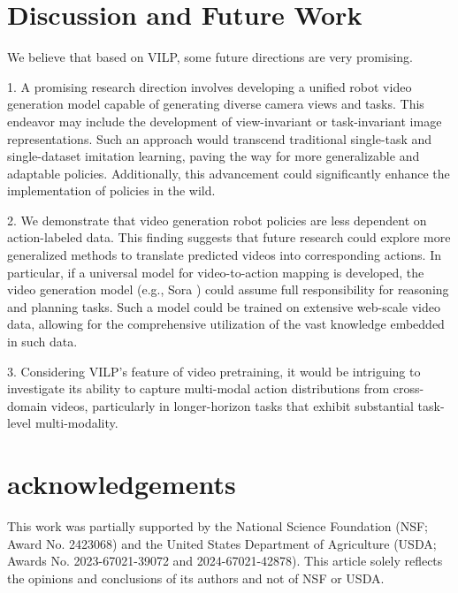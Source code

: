 \documentclass[doublecolumn]{IEEEtran}
\begin{document}
\section{Discussion and Future Work}\label{sec:discussion}
We believe that based on VILP, some future directions are very promising.

1. {A promising research direction involves developing a unified robot video generation model capable of generating diverse camera views and tasks. This endeavor may include the development of view-invariant or task-invariant image representations. Such an approach would transcend traditional single-task and single-dataset imitation learning, paving the way for more generalizable and adaptable policies. Additionally, this advancement could significantly enhance the implementation of policies in the wild.}

2. {We demonstrate that video generation robot policies are less dependent on action-labeled data. This finding suggests that future research could explore more generalized methods to translate predicted videos into corresponding actions. In particular, if a universal model for video-to-action mapping is developed, the video generation model (e.g., Sora \cite{brooks2024video}) could assume full responsibility for reasoning and planning tasks. Such a model could be trained on extensive web-scale video data, allowing for the comprehensive utilization of the vast knowledge embedded in such data.}

3. {Considering VILP's feature of video pretraining, it would be intriguing to investigate its ability to capture multi-modal action distributions from cross-domain videos, particularly in longer-horizon tasks that exhibit substantial task-level multi-modality.}

\section{acknowledgements}
This work was partially supported by the National Science Foundation (NSF; Award No. 2423068) and the United States Department of Agriculture (USDA; Awards No. 2023-67021-39072 and 2024-67021-42878). This article solely reflects the opinions and conclusions of its authors and not of NSF or USDA.

\ifCLASSOPTIONcaptionsoff
  \newpage
\fi



\end{document}
